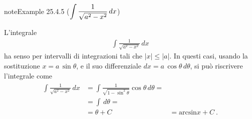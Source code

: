 \documentclass[letterpaper,10pt,italian]{jupyterBook}
\begin{document}
\begin{sphinxadmonition}{note}{Example 25.4.5 (\protect\(\displaystyle \int \frac{1}{\sqrt{a^2 - x^2}} \,  dx\protect\))}



\sphinxAtStartPar
L’integrale
\begin{equation*}
\begin{split}\int \frac{1}{\sqrt{a^2 - x^2}} \,  dx\end{split}
\end{equation*}
\sphinxAtStartPar
ha senso per intervalli di integrazioni tali che \(|x| \le |a|\). In questi casi, usando la sostituzione \(x = a \, \sin \theta\), e il suo differenziale \(dx = a \, \cos \theta \, d \theta\), si può riscrivere l’integrale come
\begin{equation*}
\begin{split}\begin{aligned}
  \int \frac{1}{\sqrt{a^2 - x^2}} \, dx
   & = \int \frac{1}{\sqrt{1- \sin^2 \theta}} \cos \theta \, d \theta = \\
   & = \int \, d \theta = \\
   & = \theta + C
   & = \text{arcsin} x + C \ .
\end{aligned}\end{split}
\end{equation*}\end{sphinxadmonition}
\label{ch/infinitesimal_calculus/integrals:example-11}
\end{document}
